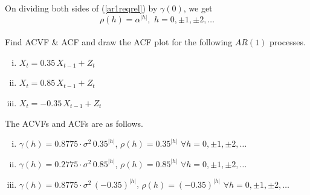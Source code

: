 \documentclass[11pt, a4paper]{article}
\begin{document}
On dividing both sides of (\ref{ar1reqrel}) by $\gamma(0)$, we get $$\rho(h) = \alpha^{|h|}, \,\, h = 0, \pm 1, \pm 2, \ldots$$ \\

\bclampe \hspace{0.1cm} Find ACVF \& ACF and draw the ACF plot for the following $AR(1)$ processes.
\begin{enumerate}[(i)]
\item $X_t = 0.35 \, X_{t-1} + Z_t$
\item $X_t = 0.85 \, X_{t-1} + Z_t$
\item $X_t = -0.35 \, X_{t-1} + Z_t$
\end{enumerate}

\bcplume \hspace{0.1cm} The ACVFs and ACFs are as follows.
\begin{enumerate}[(i)]
\item $\gamma(h) = 0.8775 \cdot \sigma^2 \, 0.35^{|h|}$, $\rho(h) = 0.35^{|h|}$ $\forall h = 0, \pm 1, \pm 2, \ldots$
\item $\gamma(h) = 0.2775 \cdot \sigma^2 \, 0.85^{|h|}$, $\rho(h) = 0.85^{|h|}$ $\forall h = 0, \pm 1, \pm 2, \ldots$
\item $\gamma(h) = 0.8775 \cdot \sigma^2 \, (-0.35)^{|h|}$, $\rho(h) = (-0.35)^{|h|}$ $\forall h = 0, \pm 1, \pm 2, \ldots$
\end{enumerate}

\newpage
\end{document}
